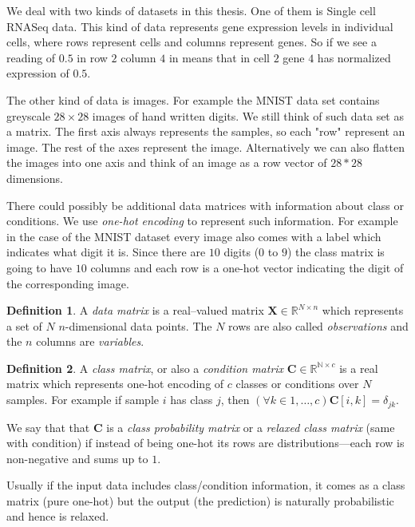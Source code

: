 \documentclass[11pt, a4paper]{report}
\theoremstyle{plain}
\theoremstyle{definition}
\newtheorem{mydef}{Definition}[chapter]
\theoremstyle{remark}
\newcommand{\N}{\mathbb{N}}
\newcommand{\R}{\mathbb{R}}
\newcommand{\bv}[1]{\boldsymbol{#1}}
\begin{document}
We deal with two kinds of datasets in this thesis. One of them is Single cell
RNASeq data. This kind of data represents gene expression levels in individual
cells, where rows represent cells and columns represent genes. So if we see a
reading of $0.5$ in row $2$ column $4$ in means that in cell $2$ gene $4$ has
normalized expression of $0.5$.

The other kind of data is images. For example the MNIST data set contains
greyscale $28 \times 28$ images of hand written digits. We still think of such
data set as a matrix. The first axis always represents the samples, so each
"row" represent an image. The rest of the axes represent the image.
Alternatively we can also flatten the images into one axis and think of an image
as a row vector of $28*28$ dimensions.

There could possibly be additional data matrices with information about class or
conditions. We use \emph{one-hot encoding} to represent such information. For
example in the case of the MNIST dataset every image also comes with a label
which indicates what digit it is. Since there are $10$ digits ($0$ to $9$) the
class matrix is going to have $10$ columns and each row is a one-hot vector
indicating the digit of the corresponding image.

\begin{mydef}
\label{def:datamatrix}
A \emph{data matrix} is a real--valued matrix $\bv{X} \in \R^{N \times n}$ which
represents a set of $N$ $n$-dimensional data points. The $N$ rows are also
called \emph{observations} and the $n$ columns are \emph{variables}.
\end{mydef}

\begin{mydef}
\label{def:classmatrix}
A \emph{class matrix}, or also a \emph{condition matrix} $\bv{C} \in \R^{\N
\times c}$ is a real matrix which represents one-hot encoding of $c$ classes or
conditions over $N$ samples. For example if sample $i$ has class $j$, then
$(\forall k\in 1, \dots, c) \bv{C}[i,k] = \delta_{jk}$.

We say that that $\bv{C}$ is a \emph{class probability matrix} or a
\emph{relaxed class matrix} (same with condition) if instead of being one-hot
its rows are distributions---each row is non-negative and sums up to $1$.
\end{mydef}

Usually if the input data includes class/condition information, it comes as a
class matrix (pure one-hot) but the output (the prediction) is naturally
probabilistic and hence is relaxed.
\end{document}
